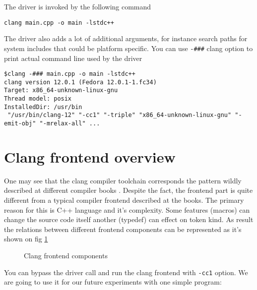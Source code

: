 The driver is invoked by the following command
\begin{verbatim}
clang main.cpp -o main -lstdc++
\end{verbatim}
The driver also adds a lot of additional arguments, for instance
search paths for system includes that could be platform specific.
You can use \texttt{-###} clang option to print actual
command line used by the driver
\begin{verbatim}
$clang -### main.cpp -o main -lstdc++
clang version 12.0.1 (Fedora 12.0.1-1.fc34)
Target: x86_64-unknown-linux-gnu
Thread model: posix
InstalledDir: /usr/bin
 "/usr/bin/clang-12" "-cc1" "-triple" "x86_64-unknown-linux-gnu" "-emit-obj" "-mrelax-all" ...
\end{verbatim}

\section{Clang frontend overview}
One may see that the clang compiler toolchain corresponds the pattern
wildly described at different compiler books
\cite{book:engineering_a_compiler}. Despite the fact, the frontend
part is quite different from a typical compiler frontend described at
the books. The primary reason for this is C++ language and it's
complexity. Some features (macros) can change the source code itself
another (typedef) can effect on token kind. As result the relations
between different frontend components can be represented as it's shown
on fig \ref{fig:clang_frontend}
\begin{figure}
\begin{center}
\end{center}
  \caption{Clang frontend components}
  \label{fig:clang_frontend}
\end{figure}

You can bypass the driver call and run the clang frontend  with
\texttt{-cc1} option. We are going to use it for our future
experiments with one simple program:
\inputminted{c++}{./src/simple/main.cpp}

